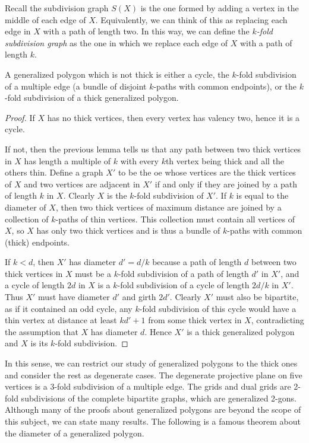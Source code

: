 Recall the subdivision graph $S(X)$ is the one formed by adding a vertex in the middle of each edge of $X$.  Equivalently, we can  think of this as replacing each edge in $X$ with a path of length two.  In this way, we can define the \textit{$\mathit{k}$-fold subdivision graph} as the one in which we replace each edge of $X$ with a path of length $k$.

\begin{theorem}
	
	A generalized polygon which is not thick is either a cycle, the $k$-fold subdivision of a multiple edge (a bundle of disjoint $k$-paths with common endpoints), or the $k$-fold subdivision of a thick generalized polygon.
	
\end{theorem}
\begin{proof}
	If $X$ has no thick vertices, then every vertex has valency two, hence it is a cycle.
	
	If not, then the previous lemma tells us that any path between two thick vertices in $X$ has length a multiple of $k$ with every $k$th vertex being thick and all the others thin.  Define a graph $X'$ to be the oe whose vertices are the thick vertices of $X$ and two vertices are adjacent in $X'$ if and only if they are joined by a path of length $k$ in $X$.  Clearly $X$ is the $k$-fold subdivision of $X'$.  If $k$ is equal to the diameter of $X$, then two thick vertices of maximum distance are joined by a collection of $k$-paths of thin vertices.  This collection must contain all vertices of $X$, so $X$ has only two thick vertices and is thus a bundle of $k$-paths with common (thick) endpoints.
	
	If $k<d$, then $X'$ has diameter $d'=d/k$ because a path of length $d$ between two thick vertices in $X$ must be a  $k$-fold subdivision of a path of length $d'$ in $X'$, and a cycle of length $2d$ in $X$ is a $k$-fold subdivision of a cycle of length $2d/k$ in $X'$.  Thus $X'$ must have diameter $d'$ and girth $2d'$.  Clearly $X'$ must also be bipartite, as if it contained an odd cycle, any $k$-fold subdivision of this cycle would have a thin vertex at distance at least $kd'+1$ from some thick vertex in $X$, contradicting the assumption that $X$ has diameter $d$.  Hence $X'$ is a thick generalized polygon and $X$ is its $k$-fold subdivision. 
\end{proof}
In this sense, we can restrict our study of generalized polygons to the thick ones and consider the rest as degenerate cases.  The degenerate projective plane on five vertices %
is a 3-fold subdivision of a multiple edge.  The grids and dual grids are 2-fold subdivisions of the complete bipartite graphs, which are generalized 2-gons.  Although many of the proofs about generalized polygons are beyond the scope of this subject, we can state many results.  The following is a famous theorem about the diameter of a generalized polygon.

